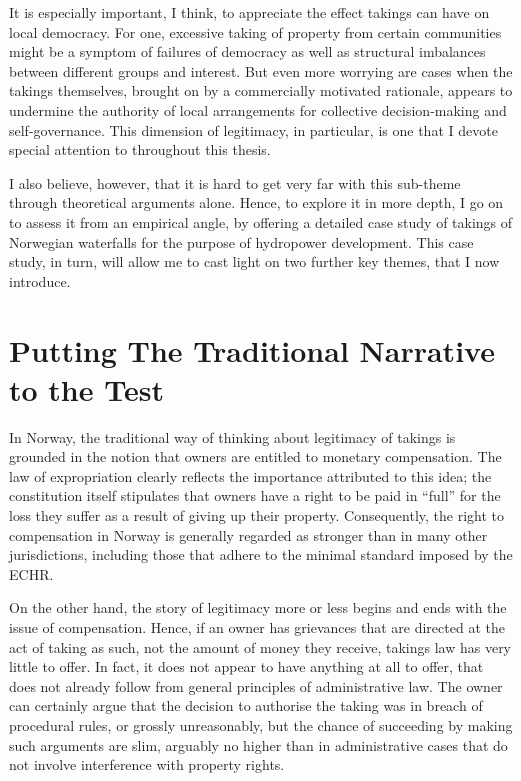 \documentclass{book} %
\begin{document}
It is especially important, I think, to appreciate the effect takings can have on local democracy. For one, excessive taking of property from certain communities might be a symptom of failures of democracy as well as structural imbalances between different groups and interest. But even more worrying are cases when the takings themselves, brought on by a commercially motivated rationale, appears to undermine the authority of local arrangements for collective decision-making and self-governance. This dimension of legitimacy, in particular, is one that I devote special attention to throughout this thesis.

I also believe, however, that it is hard to get very far with this sub-theme through theoretical arguments alone. Hence, to explore it in more depth, I go on to assess it from an empirical angle, by offering a detailed case study of takings of Norwegian waterfalls for the purpose of hydropower development. This case study, in turn, will allow me to cast light on two further key themes, that I now introduce. %

\section{Putting The Traditional Narrative to the Test}

In Norway, the traditional way of thinking about legitimacy of takings is grounded in the notion that owners are entitled to monetary compensation. The law of expropriation clearly reflects the importance attributed to this idea; the constitution itself stipulates that owners have a right to be paid in ``full'' for the loss they suffer as a result of giving up their property. Consequently, the right to compensation in Norway is generally regarded as stronger than in many other jurisdictions, including those that adhere to the minimal standard imposed by the ECHR.

On the other hand, the story of legitimacy more or less begins and ends with the issue of compensation. Hence, if an owner has grievances that are directed at the act of taking as such, not the amount of money they receive, takings law has very little to offer. In fact, it does not appear to have anything at all to offer, that does not already follow from general principles of administrative law. The owner can certainly argue that the decision to authorise the taking was in breach of procedural rules, or grossly unreasonably, but the chance of succeeding by making such arguments are slim, arguably no higher than in administrative cases that do not involve interference with property rights.
\end{document}
